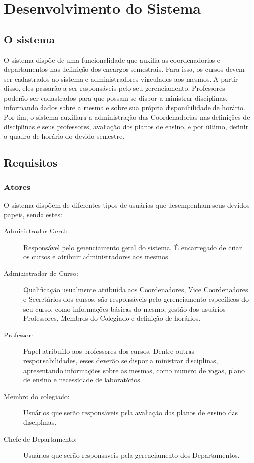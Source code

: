 \chapter{Desenvolvimento do Sistema}\label{cap:dev_sist}

\section{O sistema}

O sistema dispõe de uma funcionalidade que auxilia as coordenadorias e departamentos nas definição dos encargos semestrais. Para isso, os cursos devem ser cadastrados ao sistema e administradores vinculados aos mesmos. A partir disso, eles passarão a ser responsáveis pelo seu gerenciamento. Professores poderão ser cadastrados para que possam se dispor a ministrar disciplinas, informando dados sobre a mesma e sobre sua própria disponibilidade de horário. Por fim, o sistema auxiliará a administração das Coordenadorias nas definições de disciplinas e seus professores, avaliação dos planos de ensino, e por último, definir o quadro de horário do devido semestre.

\section{Requisitos}\label{section:dev:req}

\subsection{Atores}
O sistema dispõem de diferentes tipos de usuários que desempenham seus devidos papeis, sendo estes:

    \begin{description}
        \item[Administrador Geral:] Responsável pelo gerenciamento geral do sistema. É encarregado de criar os cursos e atribuir administradores aos mesmos. 
        \item[Administrador de Curso:] Qualificação usualmente atribuída aos Coordenadores, Vice Coordenadores e Secretários dos cursos, são responsáveis pelo gerenciamento específicos do seu curso, como informações básicas do mesmo, gestão dos usuários Professores, Membros do Colegiado e definição de horários.
        \item[Professor:] Papel atribuído aos professores dos cursos. Dentre outras responsabilidades, esses deverão se dispor a ministrar disciplinas, apresentando informações sobre as mesmas, como numero de vagas, plano de ensino e necessidade de laboratórios.
        \item[Membro do colegiado:] Usuários que serão responsáveis pela avaliação dos planos de ensino das disciplinas.
        \item[Chefe de Departamento:] Usuários que serão responsáveis pela gerenciamento dos Departamentos.
    \end{description}

